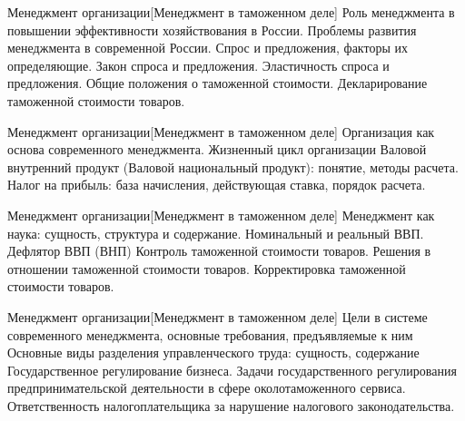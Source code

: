 \documentclass[
	11pt,
	a4paper,
	]
	{article}
\begin{document}
	

\begin{minipage}[t][\miniH]{\miniL}\centering
	 {Менеджмент организации}[Менеджмент в таможенном деле]
		{
			Роль менеджмента в повышении эффективности хозяйствования в России. Проблемы развития менеджмента в современной России.
		}{
			Спрос и предложения, факторы их определяющие. Закон спроса и предложения. Эластичность спроса и предложения.
		}{
			Общие положения о таможенной стоимости. Декларирование таможенной стоимости товаров.
		}
	\lowGE
\end{minipage}

\vfill



\begin{minipage}[t][\miniH]{\miniL}\centering
	 {Менеджмент организации}[Менеджмент в таможенном деле]
		{
			Организация как основа современного менеджмента. Жизненный цикл организации
		}{
			Валовой внутренний продукт (Валовой национальный продукт): понятие, методы расчета.
		}{
			Налог на прибыль: база начисления, действующая ставка, порядок расчета.
		}
	\lowGE
\end{minipage}

\vfill



\begin{minipage}[t][\miniH]{\miniL}\centering
	 {Менеджмент организации}[Менеджмент в таможенном деле]
		{
			Менеджмент как наука: сущность, структура и содержание.
		}{
			Номинальный и реальный ВВП. Дефлятор ВВП (ВНП)
		}{
			Контроль таможенной стоимости товаров. Решения в отношении таможенной стоимости товаров. Корректировка таможенной стоимости товаров.
		}
	\lowGE
\end{minipage}





\begin{minipage}[t][\miniH]{\miniL}\centering
	 {Менеджмент организации}[Менеджмент в таможенном деле]
		{
			Цели в системе современного менеджмента, основные требования, предъявляемые к ним Основные виды разделения управленческого труда: сущность, содержание
		}{
			Государственное регулирование бизнеса. Задачи государственного регулирования предпринимательской деятельности в сфере околотаможенного сервиса.
		}{
			Ответственность налогоплательщика за нарушение налогового законодательства.
		}
	\lowGE
\end{minipage}
\end{document}
